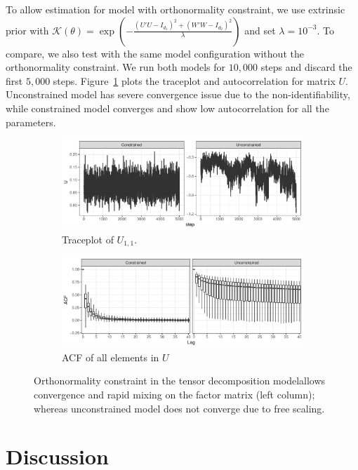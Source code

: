\documentclass[10pt]{article}
\newcommand{\mc}[1]{\mathcal{#1}}
\DeclareMathOperator{\1}{\mathbbm{1}}
\begin{document}

To allow estimation for model with orthonormality constraint, we use extrinsic prior with $\mc K(\theta) = \exp( - \frac{(U'U-I_{d_1})^2 + (W'W-I_{d_2})^2  }{\lambda})$ and set $\lambda=10^{-3}$. To compare, we also test with the same model configuration without the orthonormality constraint. We run both models for $10,000$ steps and discard the first $5,000$ steps. Figure~\ref{tucker} plots the traceplot and autocorrelation for matrix $U$. Unconstrained model has severe convergence issue due to the non-identifiability, while constrained model converges and show low autocorrelation for all the parameters.

\begin{figure}[H]
   \begin{subfigure}[b]{1\textwidth}
    \includegraphics[width=1\textwidth]{tucker_traceplot.pdf}
    \caption{Traceplot of $U_{1,1}$.}
    \end{subfigure}
    \begin{subfigure}[b]{1\textwidth}
    \includegraphics[width=1\textwidth]{tucker_acf.pdf}
    \caption{ACF of all elements in $U$}
    \end{subfigure}
\caption{Orthonormality constraint in the tensor decomposition modelallows convergence and rapid mixing on the factor matrix (left column); whereas unconstrained model does not converge due to free scaling.}
\label{tucker}
\end{figure}

\section{Discussion}




\end{document}
